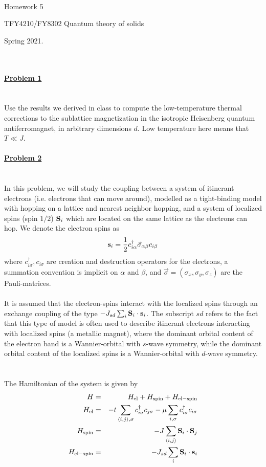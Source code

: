 \documentclass{article}
\begin{document}
\\

\centerline{\Large Homework 5}
\centerline{\Large  TFY4210/FY8302 Quantum  theory of solids}
\centerline{\Large Spring 2021.}
\normalsize
\ \\
\ \\
\underline{\large\bf Problem 1 }\\
\ \\
\ \\
Use the results we derived in class to compute the low-temperature thermal corrections to the sublattice magnetization in the isotropic Heisenberg quantum antiferromagnet, in arbitrary dimensions $d$. Low temperature here means that $T \ll J$.   
\ \\
\ \\
\underline{\large\bf Problem 2 }\\
\ \\
\ \\
In this problem, we will study the coupling between a system of itinerant electrons (i.e. electrons that can move around), modelled as a tight-binding model with hopping on a lattice and nearest neighbor hopping, and a system of localized spins (spin $1/2$) ${\bf S}_i$ which are located on the same lattice as the electrons can hop. We denote the electron spins as 
\begin{eqnarray}
{\bf s}_i = \frac{1}{2} c^{\dagger}_{i \alpha} {\vec  \sigma}_{\alpha \beta} c_{i \beta} \nonumber
\end{eqnarray}
where $c^{\dagger}_{i \sigma}, c_{i \sigma}$ are creation and destruction operators for the electrons, a summation convention is implicit on $\alpha$ and $\beta$, and $\vec \sigma = (\sigma_x,\sigma_y,\sigma_z)$ are the Pauli-matrices. 
\ \\
\ \\
It is assumed that  the electron-spins interact with the localized spins through an exchange coupling of the type 
$-J_{sd}  \sum_i {\bf S}_i \cdot {\bf s}_i$. The subscript $sd$ refers to the fact that this type of model is often used to describe itinerant electrons interacting with localized spins (a metallic magnet), where the dominant orbital content of the electron band is a Wannier-orbital with $s$-wave symmetry, while the dominant orbital content of the localized spins is a Wannier-orbital with  $d$-wave symmetry.  
\ \\
\ \\
The Hamiltonian of the system is given by 
\begin{eqnarray}
H & = & H_{\rm{el}} + H_{\rm{spin}} + H_{\rm{el-spin}} \nonumber \\ 
H_{\rm{el}} & = & - t \sum_{\langle i,j \rangle, \sigma } c^{\dagger}_{i \sigma}c_{j \sigma} - \mu \sum_{i,\sigma} c^{\dagger}_{i \sigma}c_{i \sigma} \nonumber \\
H_{\rm{spin}} & = & -J \sum_{\langle i,j \rangle } {\bf S}_i \cdot {\bf S}_j \nonumber \\ 
H_{\rm{el-spin}} & = & - J_{sd} \sum_i {\bf S}_i \cdot {\bf s}_i \nonumber 
\end{eqnarray}
\end{document}
